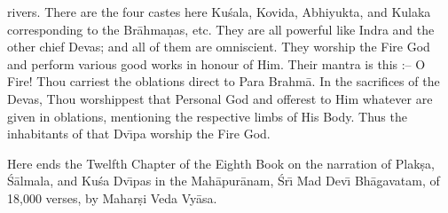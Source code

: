 rivers. There are the four castes here Ku\'sala, Kovida, Abhiyukta, and Kulaka corresponding to the Br\=ahma\d{n}as, etc. They are all powerful like Indra and the other chief Devas; and all of them are omniscient. They worship the Fire God and perform various good works in honour of Him. Their mantra is this :-- O Fire! Thou carriest the oblations direct to Para Brahm\=a. In the sacrifices of the Devas, Thou worshippest that Personal God and offerest to Him whatever are given in oblations, mentioning the respective limbs of His Body. Thus the inhabitants of that Dv\={\i}pa worship the Fire God.

Here ends the Twelfth Chapter of the Eighth Book on the narration of Plak\d{s}a, \'S\=almala, and Ku\'sa Dv\={\i}pas in the Mah\=apur\=anam, \'Sr\={\i} Mad Dev\={\i} Bh\=agavatam, of 18,000 verses, by Mahar\d{s}i Veda Vy\=asa.



